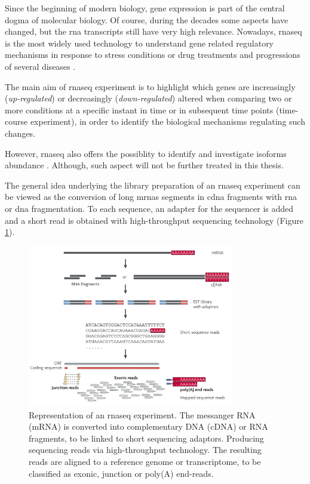 Since the beginning of modern biology, gene expression is part of the central dogma of molecular biology.
Of course, during the decades some aspects have changed, but the \gls{rna} transcripts still have very high relevance.
Nowadays, \gls{rnaseq} \cite{Thermes2014, Wang2009, Costa2010, Ozsolak2011} is the most widely used technology to understand gene related regulatory mechanisms in response to stress conditions or drug treatments and progressions of several diseases \cite{Costa2013}.

The main aim of \gls{rnaseq} experiment is to highlight which genes are increasingly (\textit{up-regulated}) or decreasingly (\textit{down-regulated}) altered when comparing two or more conditions at a specific instant in time or in subsequent time points (time-course experiment), in order to identify the biological mechanisms regulating such changes.

However, \gls{rnaseq} also offers the possiblity to identify and investigate isoforms abundance \cite{Trapnell2010, Roberts2011, Roberts2011a, Trapnell2013}.
Although, such aspect will not be further treated in this thesis.

The general idea underlying the library preparation of an \gls{rnaseq} experiment can be viewed as the conversion of long \glspl{mrna} segments in \gls{cdna} fragments with \gls{rna} or \gls{dna} fragmentation. 
To each sequence, an adapter for the sequencer is added and a short read is obtained with high-throughput sequencing technology (Figure \ref{fig:rnaseqexp}).

\begin{figure}[H]
\centering
\includegraphics[width=9cm, keepaspectratio]{img/intro/rna-seq.png}
\caption[\gls{rnaseq} experiment]{Representation of an \gls{rnaseq} experiment. 
The messanger RNA (mRNA) is converted into complementary DNA (cDNA) or RNA fragments, to be linked to short sequencing adaptors.
Producing sequencing reads via high-throughput technology.
The resulting reads are aligned to a reference genome or transcriptome, to be classified as exonic, junction or poly(A) end-reads.
\cite{Wang2009}}
\label{fig:rnaseqexp}
\end{figure}

